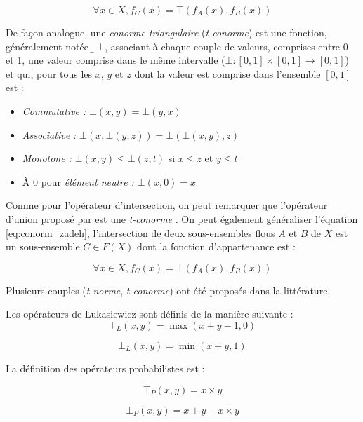 \begin{equation}
   ∀x ∈ X, f_C (x) = ⊤(f_A(x), f_B(x))  
\end{equation}

De façon analogue, une \emph{conorme triangulaire} (\emph{t-conorme})
est une fonction, généralement notée \(̱⊥\), associant à chaque couple
de valeurs, comprises entre 0 et 1, une valeur comprise dans le même
intervalle (\ie $⊥ : [0,1] × [0,1] \rightarrow [0,1]$) et qui, pour
tous les $x$, $y$ et $z$ dont la valeur est comprise dans l'ensemble
$[0,1]$ est :

\begin{itemize}
\item \emph{Commutative :} \(⊥(x,y) = ⊥(y,x)\)
\item \emph{Associative :} \(⊥(x,⊥(y,z)) = ⊥(⊥(x,y),z)\)
\item \emph{Monotone :} \(⊥(x,y) ≤ ⊥(z,t)\) si \(x ≤ z\) et \(y ≤ t\)
\item À \(0\) pour \emph{élément neutre :} \(⊥(x,0) = x\)
\end{itemize}

Comme pour l'opérateur d'intersection, on peut remarquer que
l'opérateur d'union proposé par \textcite{Zadeh1965} est une
\emph{t-conorme} \autocite{Bouchon-Meunier2007}. On peut également
généraliser l'équation \ref{eq:conorm_zadeh}, l'intersection de deux
sous-ensembles flous \(A\) et \(B\) de \(X\) est un sous-ensemble
\(C ∈ F(X)\) dont la fonction d’appartenance est :

\begin{equation}
     ∀x ∈ X, f_C (x) = ⊥(f_A(x), f_B(x))  
\end{equation}

Plusieurs couples (\emph{t-norme}, \emph{t-conorme}) ont été proposés
dans la littérature.

Les opérateurs de Łukasiewicz sont définis de la manière suivante :
\begin{equation}
  ⊤_L(x,y) = \max(x + y - 1, 0) 
\end{equation}

\begin{equation}
  ⊥_L(x,y) = \min(x + y, 1)
\end{equation}

La définition des opérateurs probabilistes est :

\begin{equation}
  ⊤_P(x,y) = x×y
\end{equation}

\begin{equation}
  ⊥_P(x,y) = x+y - x×y
\end{equation}

